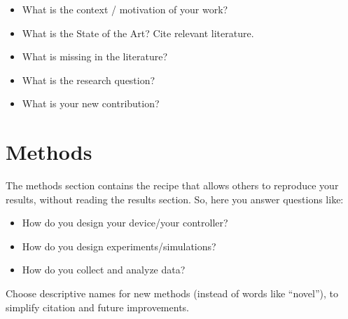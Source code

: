 \begin{itemize}
\item What is the context / motivation of your work?


\item What is the State of the Art? Cite relevant literature.

\item What is missing in the literature? 
\item What is the research question?

\item What is your new contribution?
\end{itemize}



\section{Methods}

The methods section contains the recipe that allows others to reproduce your results, without reading the results section. 
So, here you answer questions like:
\begin{itemize}
\item How do you design your device/your controller? %
\item How do you design experiments/simulations? %
\item How do you collect and analyze data? %
\end{itemize}
Choose descriptive names for new methods (instead of words like ``novel''), to simplify citation and future improvements.



